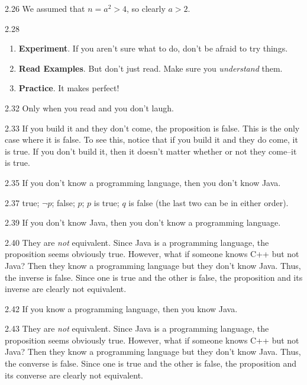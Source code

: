 \begin{Answer}{2.26}
We assumed that $n=a^2>4$, so clearly $a>2$.
\end{Answer}
\begin{Answer}{2.28}
\begin{enumerate}
\item {\bf Experiment}.  If you aren't sure what to do, don't be afraid to try things.
\item {\bf Read Examples}. But don't just read.  Make sure you {\em understand} them.
\item {\bf Practice}.  It makes perfect!
\end{enumerate}
\end{Answer}
\begin{Answer}{2.32}
Only when you read \xkcd{} and you don't laugh.
\end{Answer}
\begin{Answer}{2.33}
If you build it and they don't come, the proposition is false.  This is the only case where it is false.
To see this, notice that if you build it and they do come, it is true.  If you don't build it, then it
doesn't matter whether or not they come--it is true.
\end{Answer}
\begin{Answer}{2.35}
If you don't know a programming language, then you don't know Java.
\end{Answer}
\begin{Answer}{2.37}
true; $\neg p$; false; $p$; $p$ is true; $q$ is false (the last two can be in either order).
\end{Answer}
\begin{Answer}{2.39}
If you don't know Java, then you don't know a programming language.
\end{Answer}
\begin{Answer}{2.40}
They are {\em not} equivalent.  Since Java is a programming language, the proposition seems obviously true.
However, what if someone knows C++ but not Java?  Then they know a programming language but they don't
know Java. Thus, the inverse is false.  Since one is true and the other is false,
the proposition and its inverse are clearly not equivalent.
\end{Answer}
\begin{Answer}{2.42}
If you know a programming language, then you know Java.
\end{Answer}
\begin{Answer}{2.43}
They are {\em not} equivalent.  Since Java is a programming language, the proposition seems obviously true.
However, what if someone knows C++ but not Java?  Then they know a programming language but they don't
know Java. Thus, the converse is false.  Since one is true and the other is false,
the proposition and its converse are clearly not equivalent.
\end{Answer}
